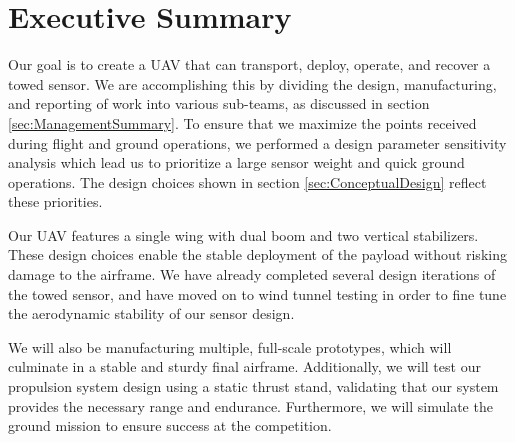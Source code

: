 \documentclass[proposal]{byu-aero}
\begin{document}
\section{Executive Summary}
\label{sec:ExecutiveSummary}

Our goal is to create a UAV that can transport, deploy, operate, and recover a towed sensor. We are accomplishing this by dividing the design, manufacturing, and reporting of work into various sub-teams, as discussed in section \cref{sec:ManagementSummary}. To ensure that we maximize the points received during flight and ground operations, we performed a design parameter sensitivity analysis which lead us to prioritize a large sensor weight and quick ground operations. The design choices shown in section \cref{sec:ConceptualDesign} reflect these priorities.

Our UAV features a single wing with dual boom and two vertical stabilizers. These design choices enable the stable deployment of the payload without risking damage to the airframe. We have already completed several design iterations of the towed sensor, and have moved on to wind tunnel testing in order to fine tune the aerodynamic stability of our sensor design.

We will also be manufacturing multiple, full-scale prototypes, which will culminate in a stable and sturdy final airframe. Additionally, we will test our propulsion system design using a static thrust stand, validating that our system provides the necessary range and endurance. Furthermore, we will simulate the ground mission to ensure success at the competition.

\end{document}
